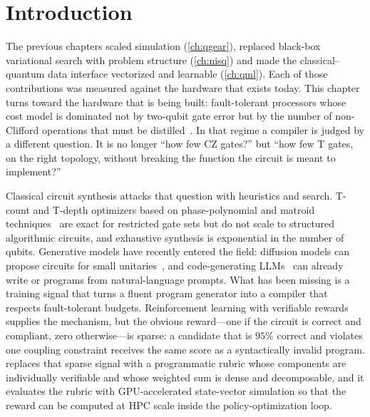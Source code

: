 \section{Introduction}\label{sec:syn:intro}

The previous chapters scaled simulation (\cref{ch:qgear}), replaced black-box variational search with problem structure (\cref{ch:nisq}) and made the classical--quantum data interface vectorized and learnable (\cref{ch:qml}). Each of those contributions was measured against the hardware that exists today. This chapter turns toward the hardware that is being built: fault-tolerant processors whose cost model is dominated not by two-qubit gate error but by the number of non-Clifford operations that must be distilled~\cite{bravyi2005magic,fowler2012surfacecodes}. In that regime a compiler is judged by a different question. It is no longer ``how few CZ gates?'' but ``how few T gates, on the right topology, without breaking the function the circuit is meant to implement?''

Classical circuit synthesis attacks that question with heuristics and search. T-count and T-depth optimizers based on phase-polynomial and matroid techniques~\cite{amy2014tpar} are exact for restricted gate sets but do not scale to structured algorithmic circuits, and exhaustive synthesis is exponential in the number of qubits. Generative models have recently entered the field: diffusion models can propose circuits for small unitaries~\cite{furrutter2024genqc}, and code-generating LLMs~\cite{chen2021codex} can already write \qiskit{} or \cudaq{} programs from natural-language prompts. What has been missing is a training signal that turns a fluent program generator into a compiler that respects fault-tolerant budgets. Reinforcement learning with verifiable rewards~\cite{deepseek2025r1} supplies the mechanism, but the obvious reward---one if the circuit is correct and compliant, zero otherwise---is sparse: a candidate that is $95\%$ correct and violates one coupling constraint receives the same score as a syntactically invalid program. \rubriq{} replaces that sparse signal with a programmatic rubric whose components are individually verifiable and whose weighted sum is dense and decomposable, and it evaluates the rubric with GPU-accelerated state-vector simulation so that the reward can be computed at HPC scale inside the policy-optimization loop.

